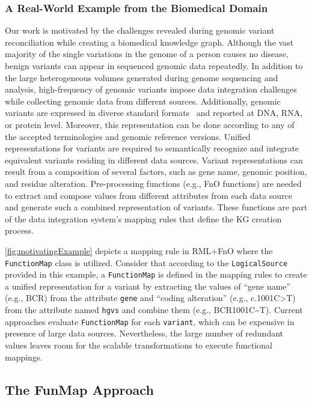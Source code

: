 \subsubsection{A Real-World Example from the Biomedical Domain}
Our work is motivated by the challenges revealed during genomic variant reconciliation while creating a biomedical knowledge graph. 
Although the vast majority of the single variations in the genome of a person causes no disease, benign variants can appear in sequenced genomic data repeatedly. In addition to the large heterogeneous volumes generated during genome sequencing and analysis, high-frequency of genomic variants impose data integration challenges while collecting genomic data from different sources. 
Additionally, genomic variants are expressed in diverse standard formats~\cite{den2016hgvs} and reported at DNA, RNA, or protein level. Moreover, this representation can be done according to any of the accepted terminologies and genomic reference versions. Unified representations for variants are required
to semantically recognize and integrate equivalent variants residing in different data sources. Variant representations can result from a composition of several factors, such as gene name, genomic position, and residue alteration. 
Pre-processing functions (e.g., FnO functions) are needed to extract and compose values from different attributes from each data source and generate such a combined representation of variants.
These functions are part of the data integration system's mapping rules that define the KG creation process. 

\autoref{fig:motivatingExample} depicts a mapping rule in  RML+FnO where the \verb|FunctionMap| class is utilized. Consider that according to the \verb|LogicalSource| provided in this example, a \verb|FunctionMap| is defined in the mapping rules to create a unified representation for a variant by extracting the values of ``gene name'' (e.g., BCR) from the attribute \verb|gene| and 
``coding alteration'' (e.g., c.1001C\textgreater T)  from the attribute named \verb|hgvs| and combine them (e.g., BCR\textunderscore1001C\textasciitilde T). Current approaches evaluate \verb|FunctionMap| for each \verb|variant|, which can be expensive in presence of large data sources. Nevertheless, the large number of redundant values leaves room for the scalable transformations to execute functional mappings. 


\subsection{The FunMap Approach}
\label{sec:approach}

